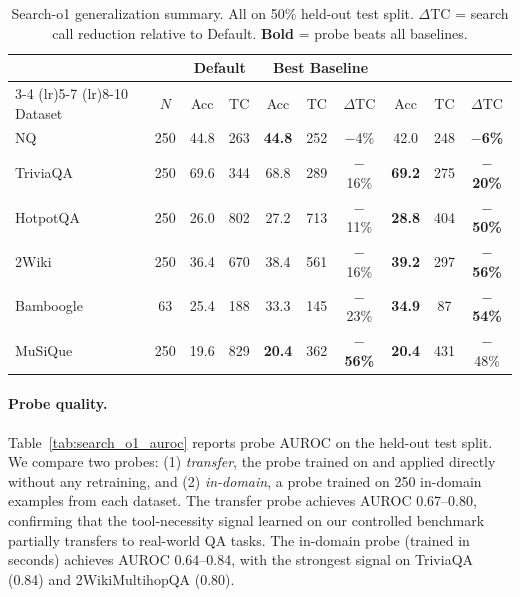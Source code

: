 \begin{table}[H]
\caption{Search-o1 generalization summary. All on 50\% held-out test split. $\Delta$TC = search call reduction relative to Default. \textbf{Bold} = probe beats all baselines.}
\label{tab:search_o1_summary}
\centering
\small
\setlength{\tabcolsep}{3pt}
\begin{tabular}{l c cc ccc ccc}
\toprule
& & \multicolumn{2}{c}{Default} & \multicolumn{3}{c}{Best Baseline} & \multicolumn{3}{c}{\method{}} \\
\cmidrule(lr){3-4} \cmidrule(lr){5-7} \cmidrule(lr){8-10}
Dataset & $N$ & Acc & TC & Acc & TC & $\Delta$TC & Acc & TC & $\Delta$TC \\
\midrule
NQ          & 250 & 44.8 & 263  & \textbf{44.8} & 252  & $-$4\%   & 42.0 & 248  & \textbf{$-$6\%} \\
TriviaQA    & 250 & 69.6 & 344  & 68.8 & 289  & $-$16\%  & \textbf{69.2} & 275  & \textbf{$-$20\%} \\
HotpotQA    & 250 & 26.0 & 802  & 27.2 & 713  & $-$11\%  & \textbf{28.8} & 404  & \textbf{$-$50\%} \\
2Wiki       & 250 & 36.4 & 670  & 38.4 & 561  & $-$16\%  & \textbf{39.2} & 297  & \textbf{$-$56\%} \\
Bamboogle   &  63 & 25.4 & 188  & 33.3 & 145  & $-$23\%  & \textbf{34.9} & 87   & \textbf{$-$54\%} \\
MuSiQue     & 250 & 19.6 & 829  & \textbf{20.4} & 362  & \textbf{$-$56\%}  & \textbf{20.4} & 431  & $-$48\% \\
\bottomrule
\end{tabular}
\end{table}

\paragraph{Probe quality.}
Table~\ref{tab:search_o1_auroc} reports probe AUROC on the held-out test split. We compare two probes: (1) \emph{\benchmark{} transfer}, the probe trained on \benchmark{} and applied directly without any retraining, and (2) \emph{in-domain}, a probe trained on 250 in-domain examples from each dataset. The \benchmark{} transfer probe achieves AUROC 0.67--0.80, confirming that the tool-necessity signal learned on our controlled benchmark partially transfers to real-world QA tasks. The in-domain probe (trained in seconds) achieves AUROC 0.64--0.84, with the strongest signal on TriviaQA (0.84) and 2WikiMultihopQA (0.80).

